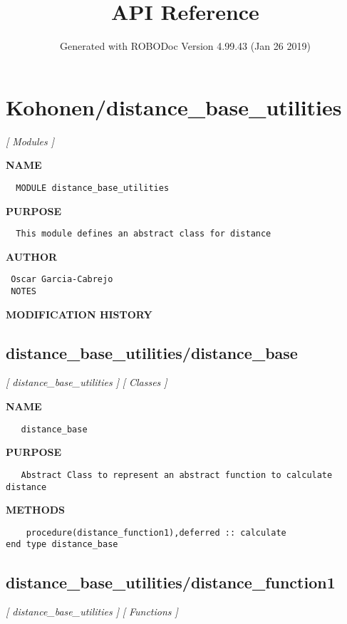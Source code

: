 \documentclass{article}
\title{API Reference}
\author{Generated with ROBODoc Version 4.99.43 (Jan 26 2019)
}
\begin{document}
\maketitle
\newpage
\tableofcontents

\newpage
\section{Kohonen/distance\_base\_utilities}
\textsl{[ Modules ]}

\label{ch:robo0}
\label{ch:Kohonen_distance_base_utilities}
\textbf{NAME}
\begin{verbatim}
  MODULE distance_base_utilities
\end{verbatim}
\textbf{PURPOSE}
\begin{verbatim}
  This module defines an abstract class for distance 
\end{verbatim}
\textbf{AUTHOR}
\begin{verbatim}
 Oscar Garcia-Cabrejo
 NOTES 
\end{verbatim}
\textbf{MODIFICATION HISTORY}
\newpage
\subsection{distance\_base\_utilities/distance\_base}
\textsl{[ distance\_base\_utilities ]}
\textsl{[ Classes ]}

\label{ch:robo10}
\label{ch:distance_base_utilities_distance_base}
\textbf{NAME}
\begin{verbatim}
   distance_base
\end{verbatim}
\textbf{PURPOSE}
\begin{verbatim}
   Abstract Class to represent an abstract function to calculate distance
\end{verbatim}
\textbf{METHODS}
\begin{verbatim}
    procedure(distance_function1),deferred :: calculate
end type distance_base
\end{verbatim}
\newpage
\subsection{distance\_base\_utilities/distance\_function1}
\textsl{[ distance\_base\_utilities ]}
\textsl{[ Functions ]}
\end{document}

